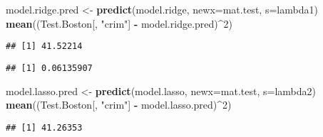 \documentclass[
]{article}
\newenvironment{Shaded}{\begin{snugshade}}{\end{snugshade}}
\newcommand{\CommentTok}[1]{\textcolor[rgb]{0.56,0.35,0.01}{\textit{#1}}}
\newcommand{\DataTypeTok}[1]{\textcolor[rgb]{0.13,0.29,0.53}{#1}}
\newcommand{\DecValTok}[1]{\textcolor[rgb]{0.00,0.00,0.81}{#1}}
\newcommand{\FloatTok}[1]{\textcolor[rgb]{0.00,0.00,0.81}{#1}}
\newcommand{\KeywordTok}[1]{\textcolor[rgb]{0.13,0.29,0.53}{\textbf{#1}}}
\newcommand{\NormalTok}[1]{#1}
\newcommand{\OperatorTok}[1]{\textcolor[rgb]{0.81,0.36,0.00}{\textbf{#1}}}
\newcommand{\StringTok}[1]{\textcolor[rgb]{0.31,0.60,0.02}{#1}}
\begin{document}
\begin{Shaded}
\begin{Highlighting}[]
\NormalTok{model.ridge.pred <-}\StringTok{ }\KeywordTok{predict}\NormalTok{(model.ridge, }\DataTypeTok{newx=}\NormalTok{mat.test, }\DataTypeTok{s=}\NormalTok{lambda1)}
\KeywordTok{mean}\NormalTok{((Test.Boston[, }\StringTok{"crim"}\NormalTok{] }\OperatorTok{-}\StringTok{ }\NormalTok{model.ridge.pred)}\OperatorTok{^}\DecValTok{2}\NormalTok{)}
\end{Highlighting}
\end{Shaded}

\begin{verbatim}
## [1] 41.52214
\end{verbatim}

\begin{Shaded}
\end{Shaded}

\begin{verbatim}
## [1] 0.06135907
\end{verbatim}

\begin{Shaded}
\begin{Highlighting}[]
\NormalTok{model.lasso.pred <-}\StringTok{ }\KeywordTok{predict}\NormalTok{(model.lasso, }\DataTypeTok{newx=}\NormalTok{mat.test, }\DataTypeTok{s=}\NormalTok{lambda2)}
\KeywordTok{mean}\NormalTok{((Test.Boston[, }\StringTok{"crim"}\NormalTok{] }\OperatorTok{-}\StringTok{ }\NormalTok{model.lasso.pred)}\OperatorTok{^}\DecValTok{2}\NormalTok{)}
\end{Highlighting}
\end{Shaded}

\begin{verbatim}
## [1] 41.26353
\end{verbatim}
\end{document}
